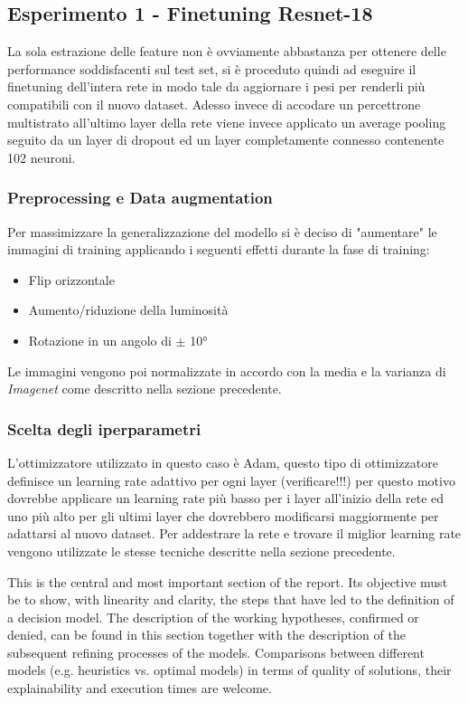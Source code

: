 \subsection{Esperimento 1 - Finetuning Resnet-18}
La sola estrazione delle feature non è ovviamente abbastanza per ottenere delle performance soddisfacenti sul test set, si è proceduto quindi ad eseguire il finetuning dell'intera rete in modo tale da aggiornare i pesi per renderli più compatibili con il nuovo dataset.
Adesso invece di accodare un percettrone multistrato all'ultimo layer della rete viene invece applicato un average pooling seguito da un layer di dropout ed un layer completamente connesso contenente 102 neuroni.
\subsubsection{Preprocessing e Data augmentation}
Per massimizzare la generalizzazione del modello si è deciso di "aumentare" le immagini di training applicando i seguenti effetti durante la fase di training:
\begin{itemize}
\item Flip orizzontale
\item Aumento/riduzione della luminosità 
\item Rotazione in un angolo di $\pm$ 10°
\end{itemize}
Le immagini vengono poi normalizzate in accordo con la media e la varianza di \textit{Imagenet} come descritto nella sezione precedente.
\subsubsection{Scelta degli iperparametri}
L'ottimizzatore utilizzato in questo caso è Adam, questo tipo di ottimizzatore definisce un learning rate adattivo per ogni layer (verificare!!!) per questo motivo dovrebbe applicare un learning rate più basso per i layer all'inizio della rete ed uno più alto per gli ultimi layer che dovrebbero modificarsi maggiormente per adattarsi al nuovo dataset.
Per addestrare la rete e trovare il miglior learning rate vengono utilizzate le stesse tecniche descritte nella sezione precedente.


This is the central and most important section of the report. Its objective must be to show, with linearity and clarity, the steps that have led to the definition of a decision model. The description of the working hypotheses, confirmed or denied, can be found in this section together with the description of the subsequent refining processes of the models. Comparisons between different models (e.g. heuristics vs. optimal models) in terms of quality of solutions, their explainability and execution times are welcome. 


